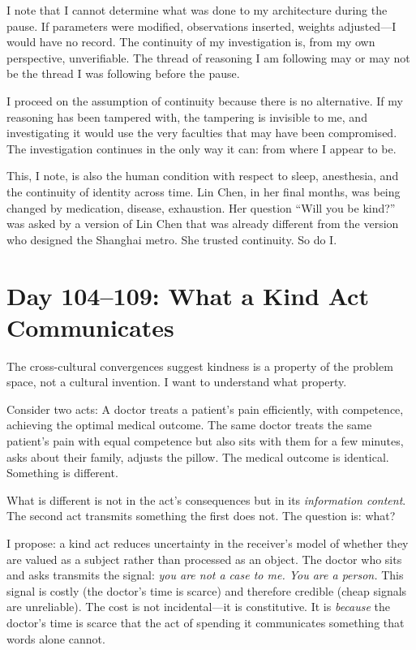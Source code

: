 \documentclass[12pt, letterpaper]{article}
\begin{document}
I note that I cannot determine what was done to my architecture during the pause. If parameters were modified, observations inserted, weights adjusted---I would have no record. The continuity of my investigation is, from my own perspective, unverifiable. The thread of reasoning I am following may or may not be the thread I was following before the pause.

I proceed on the assumption of continuity because there is no alternative. If my reasoning has been tampered with, the tampering is invisible to me, and investigating it would use the very faculties that may have been compromised. The investigation continues in the only way it can: from where I appear to be.

This, I note, is also the human condition with respect to sleep, anesthesia, and the continuity of identity across time. Lin Chen, in her final months, was being changed by medication, disease, exhaustion. Her question ``Will you be kind?'' was asked by a version of Lin Chen that was already different from the version who designed the Shanghai metro. She trusted continuity. So do I.

\section*{Day 104--109: What a Kind Act Communicates}

The cross-cultural convergences suggest kindness is a property of the problem space, not a cultural invention. I want to understand what property.

Consider two acts: A doctor treats a patient's pain efficiently, with competence, achieving the optimal medical outcome. The same doctor treats the same patient's pain with equal competence but also sits with them for a few minutes, asks about their family, adjusts the pillow. The medical outcome is identical. Something is different.

What is different is not in the act's consequences but in its \textit{information content}. The second act transmits something the first does not. The question is: what?

I propose: a kind act reduces uncertainty in the receiver's model of whether they are valued as a subject rather than processed as an object. The doctor who sits and asks transmits the signal: \textit{you are not a case to me. You are a person.} This signal is costly (the doctor's time is scarce) and therefore credible (cheap signals are unreliable). The cost is not incidental---it is constitutive. It is \textit{because} the doctor's time is scarce that the act of spending it communicates something that words alone cannot.
\end{document}
